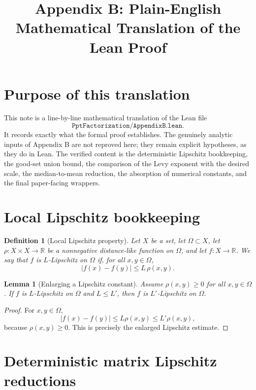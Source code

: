 \documentclass[11pt]{article}
\title{Appendix B: Plain-English Mathematical Translation of the Lean Proof}
\author{}
\date{}
\newtheorem{lemma}[theorem]{Lemma}
\newtheorem{definition}[theorem]{Definition}
\newcommand{\R}{\mathbb{R}}
\newcommand{\OmegaGood}{\Omega}
\begin{document}
\maketitle

\section*{Purpose of this translation}

This note is a line-by-line mathematical translation of the Lean file
\[
\texttt{PptFactorization/AppendixB.lean}.
\]
It records exactly what the formal proof establishes.  The genuinely analytic
inputs of Appendix B are not reproved here; they remain explicit hypotheses,
as they do in Lean.  The verified content is the deterministic Lipschitz
bookkeeping, the good-set union bound, the comparison of the Levy exponent
with the desired scale, the median-to-mean reduction, the absorption of
numerical constants, and the final paper-facing wrappers.

\section{Local Lipschitz bookkeeping}

\begin{definition}[Local Lipschitz property]
Let \(X\) be a set, let \(\OmegaGood\subset X\), let
\(\rho:X\times X\to\R\) be a nonnegative distance-like function on
\(\OmegaGood\), and let \(f:X\to\R\).  We say that \(f\) is
\(L\)-Lipschitz on \(\OmegaGood\) if, for all \(x,y\in\OmegaGood\),
\[
  |f(x)-f(y)|\le L\,\rho(x,y).
\]
\end{definition}

\begin{lemma}[Enlarging a Lipschitz constant]
Assume \(\rho(x,y)\ge0\) for all \(x,y\in\OmegaGood\).  If \(f\) is
\(L\)-Lipschitz on \(\OmegaGood\) and \(L\le L'\), then \(f\) is
\(L'\)-Lipschitz on \(\OmegaGood\).
\end{lemma}

\begin{proof}
For \(x,y\in\OmegaGood\),
\[
  |f(x)-f(y)|\le L\rho(x,y)\le L'\rho(x,y),
\]
because \(\rho(x,y)\ge0\).  This is precisely the enlarged Lipschitz
estimate.
\end{proof}

\section{Deterministic matrix Lipschitz reductions}
\end{document}
